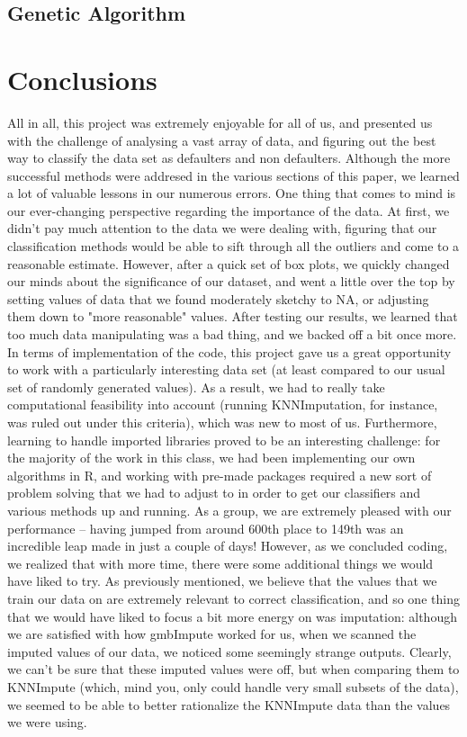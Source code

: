 \documentclass[11pt, oneside]{article}   	%
\begin{document}
	\subsection{Genetic Algorithm}
\section{Conclusions}
	All in all, this project was extremely enjoyable for all of us, and presented us with the challenge of analysing a vast array of data, and figuring out the best way to classify the data set as defaulters and non defaulters. Although the more successful methods were addresed in the various sections of this paper, we learned a lot of valuable lessons in our numerous errors.
	One thing that comes to mind is our ever-changing perspective regarding the importance of the data. At first, we didn't pay much attention to the data we were dealing with, figuring that our classification methods would be able to sift through all the outliers and come to a reasonable estimate. However, after a quick set of box plots, we quickly changed our minds about the significance of our dataset, and went a little over the top by setting values of data that we found moderately sketchy to NA, or adjusting them down to "more reasonable" values. After testing our results, we learned that too much data manipulating was a bad thing, and we backed off a bit once more.
	In terms of implementation of the code, this project gave us a great opportunity to work with a particularly interesting data set (at least compared to our usual set of randomly generated values). As a result, we had to really take computational feasibility into account (running KNNImputation, for instance, was ruled out under this criteria), which was new to most of us. Furthermore, learning to handle imported libraries proved to be an interesting challenge: for the majority of the work in this class, we had been implementing our own algorithms in R, and working with pre-made packages required a new sort of problem solving that we had to adjust to in order to get our classifiers and various methods up and running.
	As a group, we are extremely pleased with our performance -- having jumped from around 600th place to 149th was an incredible leap made in just a couple of days! However, as we concluded coding, we realized that with more time, there were some additional things we would have liked to try. As previously mentioned, we believe that the values that we train our data on are extremely relevant to correct classification, and so one thing that we would have liked to focus a bit more energy on was imputation: although we are satisfied with how gmbImpute worked for us, when we scanned the imputed values of our data, we noticed some seemingly strange outputs. Clearly, we can't be sure that these imputed values were off, but when comparing them to KNNImpute (which, mind you, only could handle very small subsets of the data), we seemed to be able to better rationalize the KNNImpute data than the values we were using. 
\end{document}
